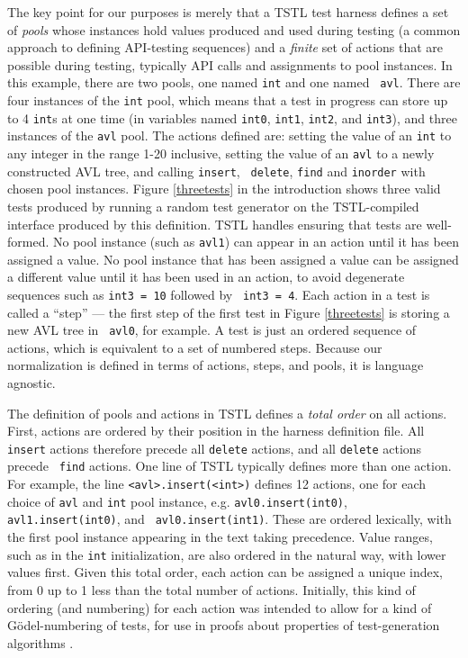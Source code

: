 The key point for our purposes is merely that a TSTL test harness
defines a set of \emph{pools} whose instances hold values produced and used
during testing \cite{AndrewsTR} (a common approach to defining
API-testing sequences) and a \emph{finite} set of actions that are possible during
testing, typically API calls and assignments to pool instances.  In this
example, there are two pools, one named {\tt int} and one named {\tt
  avl}.  There are four instances of the {\tt int} pool, which means
that a test in progress can store up to 4 {\tt int}s at one time (in
variables named {\tt int0}, {\tt int1}, {\tt int2}, and {\tt int3}), and three
instances of the {\tt avl} pool.  The actions defined are: setting
the value of an {\tt int} to any integer in the range 1-20
inclusive, setting the value of an {\tt avl} to a newly
constructed AVL tree, and calling {\tt insert}, {\tt
  delete}, {\tt find} and {\tt inorder} with chosen pool instances.  Figure
\ref{threetests} in the introduction shows three
valid tests produced by running a random test generator on
the TSTL-compiled interface produced by this definition.  TSTL handles
ensuring that tests are well-formed. No pool instance
(such as {\tt avl1}) can appear in an action until it has been assigned
a value.  No pool instance that has been assigned a value can be
assigned a different value until it has been used in an action, to
avoid degenerate sequences such as {\tt int3 = 10} followed by {\tt
  int3 = 4}.  Each action in a test is called a ``step'' --- the
first step of the first test in Figure \ref{threetests} is storing a new AVL tree in {\tt
  avl0}, for example.  A test is just an ordered sequence of
actions, which is equivalent to a set of numbered steps.  Because our
normalization is defined in terms of actions, steps, and pools, it is
language agnostic.

The definition of pools and actions in TSTL defines a \emph{total
  order} on all actions.  First, actions are ordered by their position
in the harness definition file.  All {\tt insert} actions therefore precede
all {\tt delete} actions, and all {\tt delete} actions precede {\tt
  find} actions.  One line of TSTL typically defines more than one action. For
example, the line {\tt <avl>.insert(<int>)} defines 12 actions, one
for each choice of {\tt avl} and {\tt int} pool instance, e.g.
{\tt avl0.insert(int0)}, {\tt avl1.insert(int0)}, and {\tt
  avl0.insert(int1)}.  These are
ordered lexically, with the first pool instance appearing in the text taking
precedence.  Value ranges, such as in the {\tt int} initialization, are also
ordered in the natural way, with lower values first.  Given this total
order, each action can be assigned a unique index, from 0 up to 1 less
than the total number of actions. Initially, this kind of ordering (and
numbering) for each action was intended to allow for a kind of
G\"odel-numbering of tests, for use in proofs about
properties of test-generation algorithms
\cite{AndrewsTR}.

